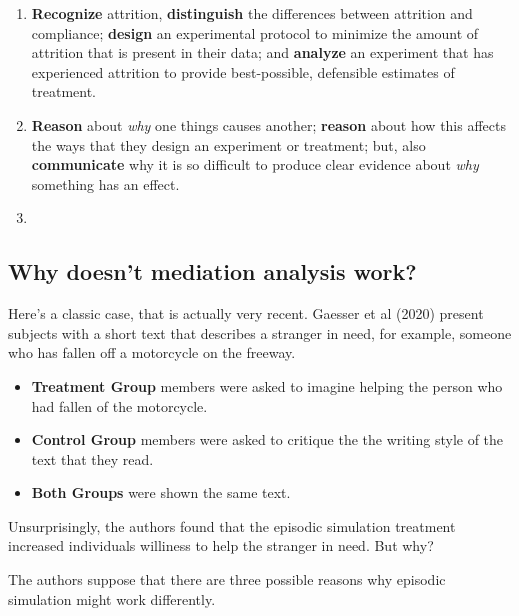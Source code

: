 \documentclass[
]{article}
\providecommand{\tightlist}{%
  \setlength{\itemsep}{0pt}\setlength{\parskip}{0pt}}
\theoremstyle{definition}
\theoremstyle{definition}
\theoremstyle{definition}
\theoremstyle{definition}
\theoremstyle{remark}
\begin{document}
\begin{enumerate}
\def\labelenumi{\arabic{enumi}.}
\tightlist
\item
  \textbf{Recognize} attrition, \textbf{distinguish} the differences between attrition and compliance; \textbf{design} an experimental protocol to minimize the amount of attrition that is present in their data; and \textbf{analyze} an experiment that has experienced attrition to provide best-possible, defensible estimates of treatment.
\item
  \textbf{Reason} about \emph{why} one things causes another; \textbf{reason} about how this affects the ways that they design an experiment or treatment; but, also \textbf{communicate} why it is so difficult to produce clear evidence about \emph{why} something has an effect.
\item
\end{enumerate}

\subsection{Why doesn't mediation analysis work?}\label{why-doesnt-mediation-analysis-work}

Here's a classic case, that is actually very recent. Gaesser et al (2020) present subjects with a short text that describes a stranger in need, for example, someone who has fallen off a motorcycle on the freeway.

\begin{itemize}
\tightlist
\item
  \textbf{Treatment Group} members were asked to imagine helping the person who had fallen of the motorcycle.
\item
  \textbf{Control Group} members were asked to critique the the writing style of the text that they read.
\item
  \textbf{Both Groups} were shown the same text.
\end{itemize}

Unsurprisingly, the authors found that the episodic simulation treatment increased individuals williness to help the stranger in need. But why?

The authors suppose that there are three possible reasons why episodic simulation might work differently.
\end{document}
